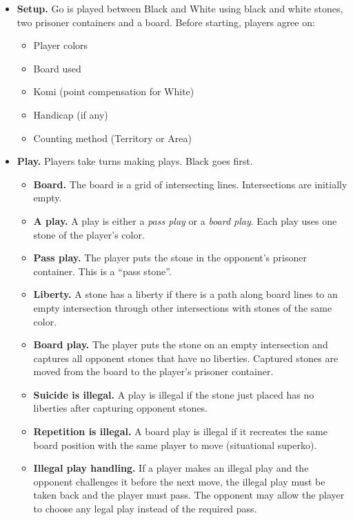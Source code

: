 \documentclass[11pt]{article}
\begin{document}
\small
\begin{itemize}
\item \textbf{Setup.} Go is played between Black and White using black and white stones, two prisoner containers and a board.
Before starting, players agree on:
    \begin{itemize}
    \item Player colors
    \item Board used
    \item Komi (point compensation for White)
    \item Handicap (if any)
    \item Counting method (Territory or Area)
    \end{itemize}

\item \textbf{Play.} Players take turns making plays.
Black goes first.
    \begin{itemize}
    \item \textbf{Board.} The board is a grid of intersecting lines.
    Intersections are initially empty.
    \item \textbf{A play.} A play is either a \textit{pass play} or a \textit{board play}.
    Each play uses one stone of the player's color.
    \item \textbf{Pass play.} The player puts the stone in the opponent's prisoner container.
    This is a ``pass stone''.
    \item \textbf{Liberty.} A stone has a liberty if there is a path along board lines to an empty intersection through other intersections with stones of the same color.
    \item \textbf{Board play.} The player puts the stone on an empty intersection and captures all opponent stones that have no liberties.
    Captured stones are moved from the board to the player's prisoner container.
    \item \textbf{Suicide is illegal.} A play is illegal if the stone just placed has no liberties after capturing opponent stones.
    \item \textbf{Repetition is illegal.} A board play is illegal if it recreates the same board position with the same player to move (situational superko).
    \item \textbf{Illegal play handling.} If a player makes an illegal play and the opponent challenges it before the next move, the illegal play must be taken back and the player must pass.
    The opponent may allow the player to choose any legal play instead of the required pass.
    \end{itemize}


\end{itemize}
\end{document}
